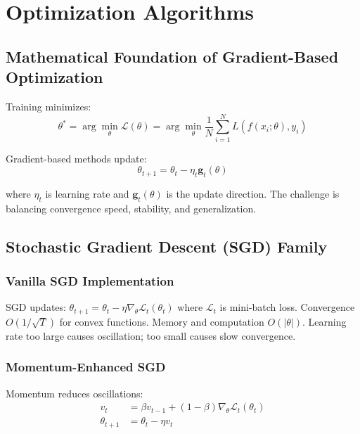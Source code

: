 \documentclass[11pt,a4paper]{report}
\begin{document}
\section{Optimization Algorithms}

\subsection{Mathematical Foundation of Gradient-Based Optimization}

Training minimizes:
\begin{equation}
\theta^* = \arg\min_\theta \mathcal{L}(\theta) = \arg\min_\theta \frac{1}{N}\sum_{i=1}^N L(f(x_i; \theta), y_i)
\end{equation}

Gradient-based methods update:
\begin{equation}
\theta_{t+1} = \theta_t - \eta_t \mathbf{g}_t(\theta)
\end{equation}

where $\eta_t$ is learning rate and $\mathbf{g}_t(\theta)$ is the update direction. The challenge is balancing convergence speed, stability, and generalization.

\subsection{Stochastic Gradient Descent (SGD) Family}

\subsubsection{Vanilla SGD Implementation}

SGD updates: $\theta_{t+1} = \theta_t - \eta \nabla_\theta \mathcal{L}_t(\theta_t)$ where $\mathcal{L}_t$ is mini-batch loss. Convergence $O(1/\sqrt{T})$ for convex functions. Memory and computation $O(|\theta|)$. Learning rate too large causes oscillation; too small causes slow convergence.

\subsubsection{Momentum-Enhanced SGD}

Momentum reduces oscillations:
\begin{align}
v_t &= \beta v_{t-1} + (1 - \beta) \nabla_\theta \mathcal{L}_t(\theta_t) \\
\theta_{t+1} &= \theta_t - \eta v_t
\end{align}
\end{document}
